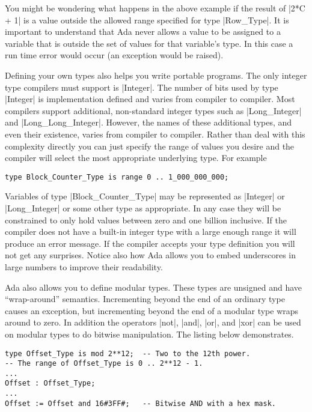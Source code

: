 You might be wondering what happens in the above example if the result of |2*C + 1| is a value
outside the allowed range specified for type |Row_Type|. It is important to understand that Ada
never allows a value to be assigned to a variable that is outside the set of values for that
variable's type. In this case a run time error would occur (an exception would be raised).

Defining your own types also helps you write portable programs. The only integer type compilers
must support is |Integer|. The number of bits used by type |Integer| is implementation defined
and varies from compiler to compiler. Most compilers support additional, non-standard integer
types such as |Long_Integer| and |Long_Long_Integer|. However, the names of these additional
types, and even their existence, varies from compiler to compiler. Rather than deal with this
complexity directly you can just specify the range of values you desire and the compiler will
select the most appropriate underlying type. For example

\begin{lstlisting}
type Block_Counter_Type is range 0 .. 1_000_000_000;
\end{lstlisting}

Variables of type |Block_Counter_Type| may be represented as |Integer| or |Long_Integer| or some
other type as appropriate. In any case they will be constrained to only hold values between zero
and one billion inclusive. If the compiler does not have a built-in integer type with a large
enough range it will produce an error message. If the compiler accepts your type definition you
will not get any surprises. Notice also how Ada allows you to embed underscores in large numbers
to improve their readability.

Ada also allows you to define modular types. These types are unsigned and have ``wrap-around''
semantics. Incrementing beyond the end of an ordinary type causes an exception, but incrementing
beyond the end of a modular type wraps around to zero. In addition the operators |not|, |and|,
|or|, and |xor| can be used on modular types to do bitwise manipulation. The listing below
demonstrates.

\begin{lstlisting}
type Offset_Type is mod 2**12;  -- Two to the 12th power.
-- The range of Offset_Type is 0 .. 2**12 - 1.
...
Offset : Offset_Type;
...
Offset := Offset and 16#3FF#;   -- Bitwise AND with a hex mask.
\end{lstlisting}

